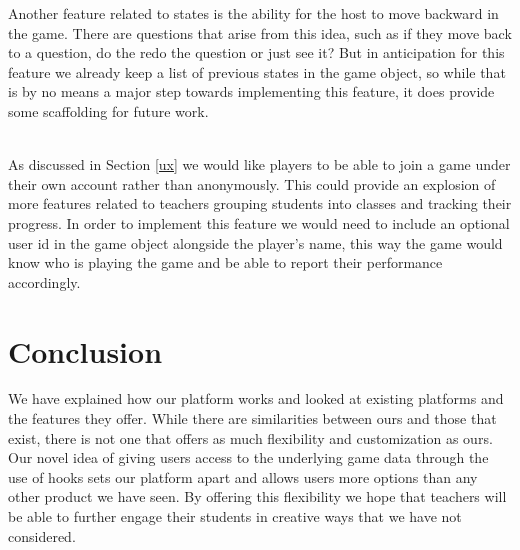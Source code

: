 \documentclass{article}
\begin{document}
    Another feature related to states is the ability for the host to move backward in the game. There are questions that arise from this idea, such as if they move back to a question, do the redo the question or just see it? But in anticipation for this feature we already keep a list of previous states in the game object, so while that is by no means a major step towards implementing this feature, it does provide some scaffolding for future work.
    \\\\
    \smallskip
    
    As discussed in Section \ref{ux} we would like players to be able to join a game under their own account rather than anonymously. This could provide an explosion of more features related to teachers grouping students into classes and tracking their progress. In order to implement this feature we would need to include an optional user id in the game object alongside the player's name, this way the game would know who is playing the game and be able to report their performance accordingly.
    
\section{Conclusion}
    We have explained how our platform works and looked at existing platforms and the features they offer. While there are similarities between ours and those that exist, there is not one that offers as much flexibility and customization as ours. Our novel idea of giving users access to the underlying game data through the use of hooks sets our platform apart and allows users more options than any other product we have seen. By offering this flexibility we hope that teachers will be able to further engage their students in creative ways that we have not considered. 

\printbibliography[title={Bibliography}]
\end{document}
